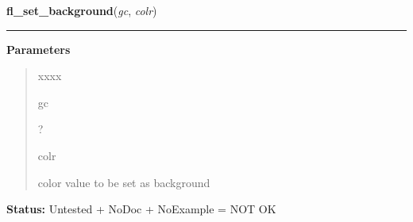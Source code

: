 \hspace{.8\funcindent}\begin{boxedminipage}{\funcwidth}

    \raggedright \textbf{fl\_set\_background}(\textit{gc}, \textit{colr})

    \vspace{-1.5ex}

    \rule{\textwidth}{0.5\fboxrule}
\setlength{\parskip}{2ex}
\setlength{\parskip}{1ex}
      \textbf{Parameters}
      \vspace{-1ex}

      \begin{quote}
        \begin{Ventry}{xxxx}

          \item[gc]

          ?

          \item[colr]

          color value to be set as background

        \end{Ventry}

      \end{quote}

\textbf{Status:} Untested + NoDoc + NoExample = NOT OK



    \end{boxedminipage}

    \label{xformslib:library:fl_wincreate}

    \vspace{0.5ex}

